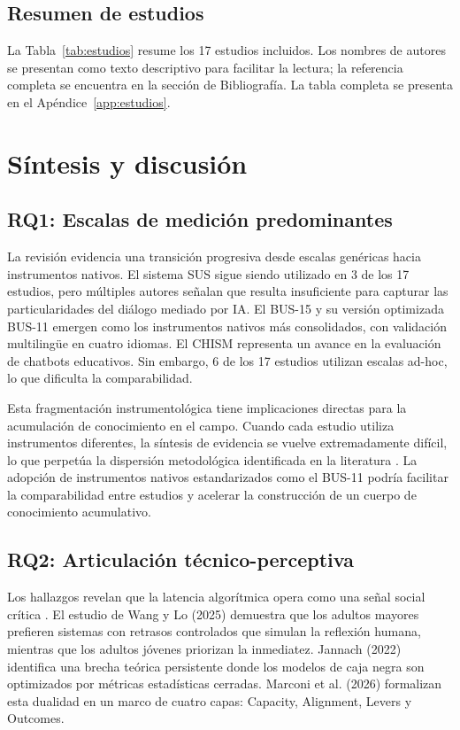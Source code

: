 \documentclass[11pt,twocolumn]{article}
\begin{document}
\subsection{Resumen de estudios}

La Tabla~\ref{tab:estudios} resume los 17 estudios incluidos. Los nombres de autores se presentan como texto descriptivo para facilitar la lectura; la referencia completa se encuentra en la sección de Bibliografía. La tabla completa se presenta en el Apéndice~\ref{app:estudios}.

\section{Síntesis y discusión}

\subsection{RQ1: Escalas de medición predominantes}

La revisión evidencia una transición progresiva desde escalas genéricas hacia instrumentos nativos. El sistema SUS sigue siendo utilizado en 3 de los 17 estudios, pero múltiples autores \cite{borsci2021, marconi2026} señalan que resulta insuficiente para capturar las particularidades del diálogo mediado por IA. El BUS-15 y su versión optimizada BUS-11 \cite{borsci2022} emergen como los instrumentos nativos más consolidados, con validación multilingüe en cuatro idiomas. El CHISM \cite{belda2023} representa un avance en la evaluación de chatbots educativos. Sin embargo, 6 de los 17 estudios utilizan escalas ad-hoc, lo que dificulta la comparabilidad.

Esta fragmentación instrumentológica tiene implicaciones directas para la acumulación de conocimiento en el campo. Cuando cada estudio utiliza instrumentos diferentes, la síntesis de evidencia se vuelve extremadamente difícil, lo que perpetúa la dispersión metodológica identificada en la literatura \cite{folstad2021}. La adopción de instrumentos nativos estandarizados como el BUS-11 podría facilitar la comparabilidad entre estudios y acelerar la construcción de un cuerpo de conocimiento acumulativo.

\subsection{RQ2: Articulación técnico-perceptiva}

Los hallazgos revelan que la latencia algorítmica opera como una señal social crítica \cite{wang2025}. El estudio de Wang y Lo (2025) \cite{wang2025} demuestra que los adultos mayores prefieren sistemas con retrasos controlados que simulan la reflexión humana, mientras que los adultos jóvenes priorizan la inmediatez. Jannach (2022) \cite{jannach2022} identifica una brecha teórica persistente donde los modelos de caja negra son optimizados por métricas estadísticas cerradas. Marconi et al. (2026) \cite{marconi2026} formalizan esta dualidad en un marco de cuatro capas: Capacity, Alignment, Levers y Outcomes.
\end{document}
